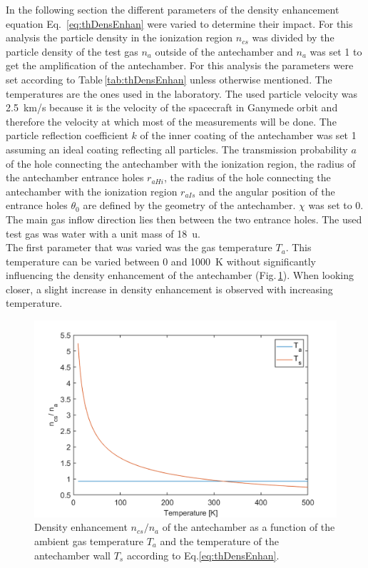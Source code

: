 	In the following section the different parameters of the density enhancement equation Eq.~\eqref{eq:thDensEnhan} were varied to determine their impact. For this analysis the particle density in the ionization region $n_{cs}$ was divided by the particle density of the test gas $n_a$ outside of the antechamber and $n_a$ was set 1 to get the amplification of the antechamber. For this analysis the parameters were set according to Table\,\ref{tab:thDensEnhan} unless otherwise mentioned. The temperatures are the ones used in the laboratory. The used particle velocity was 2.5~km/s because it is the velocity of the spacecraft in Ganymede orbit and therefore the velocity at which most of the measurements will be done.	The particle reflection coefficient $k$ of the inner coating of the antechamber was set 1 assuming an ideal coating reflecting all particles. The transmission probability $a$ of the hole connecting the antechamber with the ionization region, the radius of the antechamber entrance holes $r_{aHi}$, the radius of the hole connecting the antechamber with the ionization region $r_{aIs}$ and the angular position of the entrance holes $\theta_0$ are defined by the geometry of the antechamber. $\chi$ was set to 0\degree. The main gas inflow direction lies then between the two entrance holes. The used test gas was water with a unit mass of 18~u.\\
	The first parameter that was varied was the gas temperature $T_a$. This temperature can be varied between 0 and 1000~K without significantly influencing the density enhancement of the antechamber (Fig.\,\ref{th:densEnhTaTs}). When looking closer, a slight increase in density enhancement is observed with increasing temperature.\\
	\begin{figure}[h] %
		\centering
		\includegraphics[width= .7\textwidth]{Bilder/Ta_Ts.png}
		\caption{Density enhancement $n_{cs}/n_a$ of the antechamber as a function of the ambient gas temperature $T_a$ and the temperature of the antechamber wall $T_s$ according to Eq.\eqref{eq:thDensEnhan}.}
		\label{th:densEnhTaTs}
	\end{figure}
